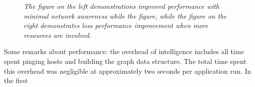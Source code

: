 \documentclass{rspublic}
\begin{document}
\begin{center}
\begin{figure}
\caption{\textit{The figure on the left demonstrations improved
performance with minimal network awareness while the figure, while the
figure on the right demonstrates less performance improvement when more
resources are involved.}}
\label{experiment2}
\end{figure}
\end{center}

Some remarks about performance: the overhead of intelligence includes
all time spent pinging hosts and building the graph data structure. The
total time spent this overhead was negligible at approximately two
seconds per application run. In the first
\end{document}
